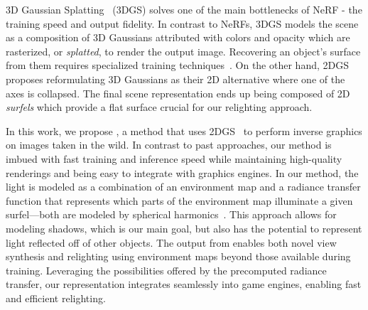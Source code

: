 
  3D Gaussian Splatting~\cite{kerbl20233d} (3DGS) solves one of the main bottlenecks of NeRF - the training speed and output fidelity.
  In contrast to NeRFs, 3DGS models the scene as a composition of 3D Gaussians
  attributed with colors and opacity which are rasterized, or
  \textit{splatted}, to render the output image.
  Recovering an object's surface from them requires specialized training
  techniques~\cite{guedon2024sugar}.
  On the other hand, 2DGS~\cite{huang20242d} proposes reformulating 3D
  Gaussians as their 2D alternative where one of the axes is collapsed.
  The final scene representation ends up being composed of 2D \textit{surfels}
  which provide a flat surface crucial for our relighting approach.

  In this work, we propose \lumigauss, a method that uses
  2DGS~\cite{huang20242d} to perform inverse graphics on images taken in the
  wild.
  In contrast to past approaches, our method is imbued with fast training and
  inference speed while maintaining high-quality renderings and being easy to
  integrate with graphics engines.
  In our method, the light is modeled as a combination of an environment map
  and a radiance transfer function that represents which parts of the
  environment map illuminate a given surfel---both are modeled by spherical
  harmonics~\cite{ramamoorthi2001envmap}.
  This approach allows for modeling shadows, which is our main goal, but also
  has the potential to represent light reflected off of other objects.
  The output from \lumigauss enables both novel view synthesis and relighting
  using environment maps beyond those available during training.
  Leveraging the possibilities offered by the precomputed radiance transfer,
  our representation integrates seamlessly into game engines, enabling fast
  and efficient relighting.

